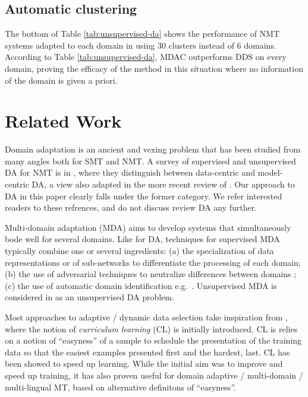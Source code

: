 \documentclass[11pt]{article}
\begin{document}
\subsection{Automatic clustering}
The bottom of Table \ref{tab:unsupervised-da} shows the performance of NMT systems adapted to each domain in using 30 clusters instead of 6 domains. According to Table \ref{tab:unsupervised-da}, MDAC outperforms DDS on every domain, proving the efficacy of the method in this situation where no information of the domain is given a priori.

\section{Related Work \label{sec:related}}

Domain adaptation is an ancient and vexing problem that has been studied from many angles both for SMT and NMT. A survey of supervised and unsupervised DA for NMT is in \citet{Chu18asurvey}, where they distinguish between data-centric and model-centric DA, a view also adapted in the more recent review of \citet{Saunders21domain}. Our approach to DA in this paper clearly falls under the former category. We refer interested readers to these refrences, and do not discuss review DA any further.

Multi-domain adaptation (MDA) aims to develop systems that simultaneously bode well for several domains. Like for DA, techniques for supervised MDA typically combine one or several ingredients: (a) the specialization of data representations \citep{Kobus17domaincontrol} or of sub-networks \citep{Pham19generic} to differentiate the processing of each domain; (b) the use of adversarial techniques to neutralize differences between domains \cite{Britz17mixing,Zeng18multidomain}; (c) the use of automatic domain identification e.g.\ \citet{Jiang19multidomain}. Unsupervised MDA is considered in \citet{Farajian17multidomain} as an unsupervised DA problem.

Most approaches to adaptive / dynamic data selection take inspiration from \citet{Bengio09curriculum}, where the notion of \emph{curriculum learning} (CL) is initially introduced. CL is relies on a notion of ``easyness'' of a sample to schedule the presentation of the training data so that the easiest examples  presented first and the hardest, last. CL has been showed to speed up learning. While the initial aim was to improve and speed up training, it has also proven useful for domain adaptive / multi-domain / multi-lingual MT, based on alternative definitons of ``easyness''.
\end{document}
